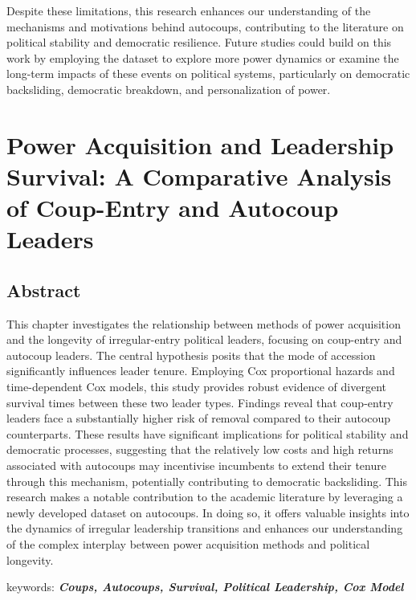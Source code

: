 \documentclass[
  12pt,
]{report}
\begin{document}
Despite these limitations, this research enhances our understanding of
the mechanisms and motivations behind autocoups, contributing to the
literature on political stability and democratic resilience. Future
studies could build on this work by employing the dataset to explore
more power dynamics or examine the long-term impacts of these events on
political systems, particularly on democratic backsliding, democratic
breakdown, and personalization of power.

\chapter{Power Acquisition and Leadership Survival: A Comparative
Analysis of Coup-Entry and Autocoup
Leaders}\label{power-acquisition-and-leadership-survival-a-comparative-analysis-of-coup-entry-and-autocoup-leaders}

\section*{Abstract}\label{abstract-3}

This chapter investigates the relationship between methods of power
acquisition and the longevity of irregular-entry political leaders,
focusing on coup-entry and autocoup leaders. The central hypothesis
posits that the mode of accession significantly influences leader
tenure. Employing Cox proportional hazards and time-dependent Cox
models, this study provides robust evidence of divergent survival times
between these two leader types. Findings reveal that coup-entry leaders
face a substantially higher risk of removal compared to their autocoup
counterparts. These results have significant implications for political
stability and democratic processes, suggesting that the relatively low
costs and high returns associated with autocoups may incentivise
incumbents to extend their tenure through this mechanism, potentially
contributing to democratic backsliding. This research makes a notable
contribution to the academic literature by leveraging a newly developed
dataset on autocoups. In doing so, it offers valuable insights into the
dynamics of irregular leadership transitions and enhances our
understanding of the complex interplay between power acquisition methods
and political longevity.

keywords: \textbf{\emph{Coups, Autocoups, Survival, Political
Leadership, Cox Model}}

\newpage
\end{document}
